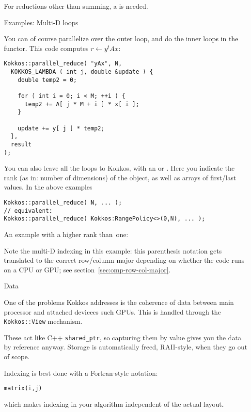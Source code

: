 For reductions other than summing, a  is needed.
%

 {Examples: Multi-D loops}

You can of course parallelize over the outer loop, and do the inner loops
in the functor.
This code computes $r\leftarrow y^tAx$:
%
\begin{lstlisting}
Kokkos::parallel_reduce( "yAx", N,
  KOKKOS_LAMBDA ( int j, double &update ) {
    double temp2 = 0;

    for ( int i = 0; i < M; ++i ) {
      temp2 += A[ j * M + i ] * x[ i ];
    }

    update += y[ j ] * temp2;
  },
  result
);  
\end{lstlisting}

You can also leave all the loops to Kokkos, with an
 or .
Here you indicate the rank (as in: number of dimensions) of the object,
as well as arrays of first/last values.
In the above examples
\begin{lstlisting}
Kokkos::parallel_reduce( N, ... );
// equivalent: 
Kokkos::parallel_reduce( Kokkos:RangePolicy<>(0,N), ... );  
\end{lstlisting}

An example with a higher rank than~one:
%

Note the multi-D indexing in this example: this parenthesis notation
gets translated to the correct row/column-major depending on whether the
code runs on a CPU or GPU; see section~\ref{sec:omp-row-col-major}.

 {Data}
\label{sec:kokkos-data}

One of the problems Kokkos addresses is the coherence of data between
main processor and attached devicees such \acp{GPU}.
This is handled through the \lstinline+Kokkos::View+ mechanism.


These act like C++ \lstinline+shared_ptr+, so capturing them by value
gives you the data by reference anyway.
Storage is automatically freed, RAII-style,
when they go out of scope.

Indexing is best done with a Fortran-style notation:
\begin{lstlisting}
matrix(i,j)
\end{lstlisting}
which makes indexing in your algorithm independent
of the actual layout.

